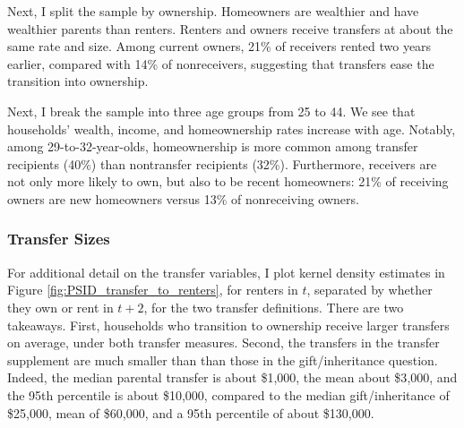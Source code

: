 \documentclass[12pt]{article}
\begin{document}
Next, I split the sample by ownership. Homeowners are wealthier and have wealthier parents than renters. Renters and owners receive transfers at about the same rate and size. Among current owners, 21\% of receivers rented two years earlier, compared with 14\% of nonreceivers, suggesting that transfers ease the transition into ownership.

Next, I break the sample into three age groups from 25 to 44. We see that households' wealth, income, and homeownership rates increase with age. Notably, among 29-to-32-year-olds, homeownership is more common among transfer recipients (40\%) than nontransfer recipients (32\%). Furthermore, receivers are not only more likely to own, but also to be recent homeowners: 21\% of receiving owners are new homeowners versus 13\% of nonreceiving owners. 

\subsubsection{Transfer Sizes}
For additional detail on the transfer variables, I plot kernel density estimates in Figure \ref{fig:PSID_transfer_to_renters}, for renters in $t$, separated by whether they own or rent in $t+2$, for the two transfer definitions. There are two takeaways. First, households who transition to ownership receive larger transfers on average, under both transfer measures. Second, the transfers in the transfer supplement are much smaller than than those in the gift/inheritance question. Indeed, the median parental transfer is about \$1{,}000, the mean about \$3{,}000, and the 95th percentile is about \$10{,}000, compared to the median gift/inheritance of \$25{,}000, mean of \$60{,}000, and a 95th percentile of about \$130{,}000.
\end{document}
